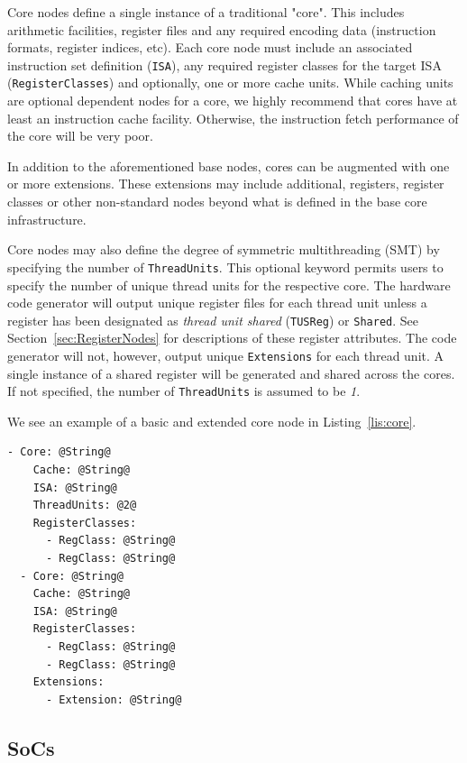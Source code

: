 \documentclass{article}
\begin{document}
Core nodes define a single instance of a traditional "core".  This includes arithmetic facilities, register files 
and any required encoding data (instruction formats, register indices, etc).  Each core node must include 
an associated instruction set definition (\texttt{ISA}), any required register classes for the target ISA (\texttt{RegisterClasses}) 
and optionally, one or more cache units.  While caching units are optional dependent nodes for a core, we 
highly recommend that cores have at least an instruction cache facility.  Otherwise, the instruction fetch 
performance of the core will be very poor.  

In addition to the aforementioned base nodes, cores can be augmented with one or more extensions.  These extensions 
may include additional, registers, register classes or other non-standard nodes beyond what is defined in the base 
core infrastructure.

Core nodes may also define the degree of symmetric multithreading (SMT) by specifying the number of \texttt{ThreadUnits}.  
This optional keyword permits users to specify the number of unique thread units for the respective core.  The hardware 
code generator will output unique register files for each thread unit unless a register has been designated as 
\textit{thread unit shared} (\texttt{TUSReg}) or \texttt{Shared}.  See Section~\ref{sec:RegisterNodes} for descriptions 
of these register attributes.    
The code generator will not, however, output unique \texttt{Extensions} for each thread unit.  
A single instance of a shared register will be generated and shared across the cores.  If not specified, the number of 
\texttt{ThreadUnits} is assumed to be \textit{1}.  

We see an example of a basic and extended core node in Listing~\ref{lis:core}.   

\vspace{0.125in}
\begin{lstlisting}[frame=single,style=base,caption={Core Node Definition},captionpos=b,label={lis:core}]
- Core: @String@
    Cache: @String@
    ISA: @String@
    ThreadUnits: @2@
    RegisterClasses:
      - RegClass: @String@
      - RegClass: @String@
  - Core: @String@
    Cache: @String@
    ISA: @String@
    RegisterClasses:
      - RegClass: @String@
      - RegClass: @String@
    Extensions:
      - Extension: @String@
\end{lstlisting}

\clearpage
\subsection{SoCs}
\label{sec:SoCNodes}
\end{document}
